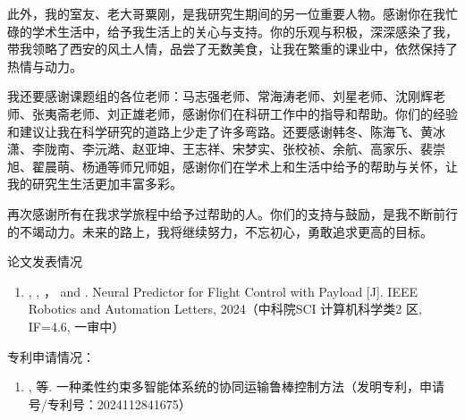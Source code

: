 \documentclass[lang=chs, degree=master, blindreview=false, winfonts=true]{yanputhesis}
\begin{document}
\begin{acknowledgements}
此外，我的室友、老大哥粟刚，是我研究生期间的另一位重要人物。感谢你在我忙碌的学术生活中，给予我生活上的关心与支持。你的乐观与积极，深深感染了我，带我领略了西安的风土人情，品尝了无数美食，让我在繁重的课业中，依然保持了热情与动力。

我还要感谢课题组的各位老师：马志强老师、常海涛老师、刘星老师、沈刚辉老师、张夷斋老师、刘正雄老师，感谢你们在科研工作中的指导和帮助。你们的经验和建议让我在科学研究的道路上少走了许多弯路。还要感谢韩冬、陈海飞、黄冰潇、李陇南、李沅澔、赵亚坤、王志祥、宋梦实、张校祯、余航、高家乐、裴崇旭、翟晨萌、杨通等师兄师姐，感谢你们在学术上和生活中给予的帮助与关怀，让我的研究生生活更加丰富多彩。

再次感谢所有在我求学旅程中给予过帮助的人。你们的支持与鼓励，是我不断前行的不竭动力。未来的路上，我将继续努力，不忘初心，勇敢追求更高的目标。
\end{acknowledgements}                                      %
\begin{accomplishments}                                     %
	论文发表情况
	\begin{enumerate}
		\item {}, , ，  and . Neural Predictor for Flight Control with Payload [J].  IEEE Robotics
		and Automation Letters, 2024（中科院SCI 计算机科学类2 区, IF=4.6, 一审中）
	\end{enumerate}

    专利申请情况：
    \begin{enumerate}
    	\item {}, 等. 一种柔性约束多智能体系统的协同运输鲁棒控制方法（发明专利，申请号/专利号：2024112841675）
    \end{enumerate}
\end{accomplishments}                                       %
\makestatement                                              %
\end{document}
